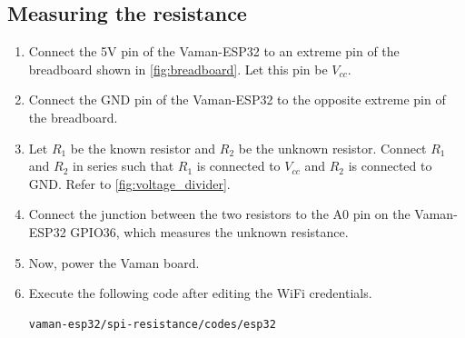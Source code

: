 \subsection{Measuring the resistance}
\begin{enumerate}
\item
Connect the 5V pin of the Vaman-ESP32 to an extreme pin of the breadboard shown 
in \autoref{fig:breadboard}. Let this pin be $V_{cc}$.
\item
Connect the GND pin of the Vaman-ESP32 to the opposite extreme pin of the 
breadboard.
\item
Let $R_1$ be the known resistor and $R_2$ be the unknown resistor. Connect $R_1$
and $R_2$ in series such that $R_1$ is connected to $V_{cc}$ and $R_2$ is 
connected to GND. Refer to \autoref{fig:voltage_divider}.
\item
Connect the junction between the two resistors to the A0 pin on the Vaman-ESP32 
GPIO36, which measures the unknown resistance.
\item
Now, power the Vaman board.
\item
Execute the following code after editing the WiFi credentials.
\begin{lstlisting}
vaman-esp32/spi-resistance/codes/esp32
\end{lstlisting}
\end{enumerate}
